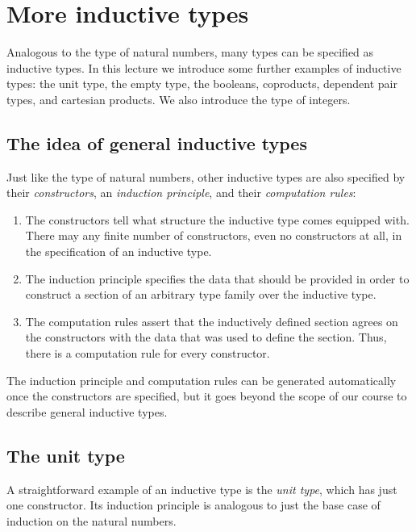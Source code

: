 \section{More inductive types}

Analogous to the type of natural numbers, many types can be specified as inductive types. In this lecture we introduce some further examples of inductive types: the unit type, the empty type, the booleans, coproducts, dependent pair types, and cartesian products. We also introduce the type of integers.

\subsection{The idea of general inductive types}

Just like the type of natural numbers, other inductive types are also specified by their \emph{constructors}, an \emph{induction principle}, and their \emph{computation rules}: 
\begin{enumerate}
\item The constructors tell what structure the inductive type comes equipped with. There may any finite number of constructors, even no constructors at all, in the specification of an inductive type. 
\item The induction principle specifies the data that should be provided in order to construct a section of an arbitrary type family over the inductive type. 
\item The computation rules assert that the inductively defined section agrees on the constructors with the data that was used to define the section. Thus, there is a computation rule for every constructor.
\end{enumerate}
The induction principle and computation rules can be generated automatically once the constructors are specified, but it goes beyond the scope of our course to describe general inductive types.


\subsection{The unit type}
A straightforward example of an inductive type is the \emph{unit type}, which has just one constructor. 
Its induction principle is analogous to just the base case of induction on the natural numbers.

